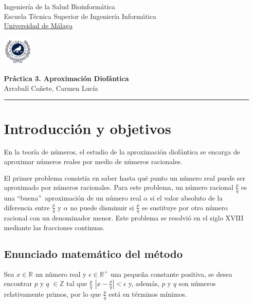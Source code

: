 \documentclass[11pt,letterpaper]{article}
\begin{document}

\usetikzlibrary{positioning}
\pagestyle{plain}
\begin{flushleft}
Ingeniería de la Salud \hfill Bioinformática\\
Escuela Técnica Superior de Ingeniería Informática\\
\underline{Universidad de Málaga}
\end{flushleft}

\begin{flushright}\vspace{-5mm}
\includegraphics[height=1.5cm]{escudo.jpg}
\end{flushright}

\begin{center}\vspace{-1cm}
\textbf{\large Práctica 3. Aproximación Diofántica}\\   %
Arrabalí Cañete, Carmen Lucía\\                         %
\end{center}
\rule{\linewidth}{0.1mm}


\section{Introducción y objetivos}
En la teoría de números, el estudio de la aproximación diofántica se encarga de aproximar números reales por medio de números racionales.

El primer problema consistía en saber hasta qué punto un número real puede ser aproximado por números racionales. Para este problema, un número racional $\frac{p}{q}$ es una \textquotedblleft buena\textquotedblright\ aproximación de un número real $\alpha$ si el valor absoluto de la diferencia entre $\frac{p}{q}$ y $\alpha$ no puede disminuir si $\frac{p}{q}$ se sustituye por otro número racional con un denominador menor. Este problema se resolvió en el siglo XVIII mediante las fracciones continuas.

\subsection{Enunciado matemático del método}
Sea $x \in \mathbb{R}$ un número real y $\epsilon \in \mathbb{R}^+$ una pequeña constante positiva, se desea encontrar $p$ y $q$ $\in \mathbb{Z}$ tal que $\frac{p}{q}$  $\left |  x - \frac{p}{q} \right | < \epsilon $ y, además, $p$ y $q$ son números relativamente primos, por lo que $\frac{p}{q}$ está en términos mínimos.
\end{document}
